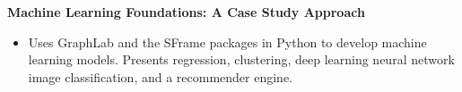 \documentclass[margin,10pt]{res} %
\begin{document}
\begin{resume}
\begin{itemize}
\end{itemize}
\textbf{Machine Learning Foundations: A Case Study Approach}%
 \href{https://www.coursera.org/learn/ml-foundations}{} \\
 \begin{itemize} %
\item Uses GraphLab and the SFrame packages in Python to develop machine learning models. Presents regression, clustering, deep learning neural network image classification, and a recommender engine. 
\end{itemize}






\end{resume}
\vspace*{-2cm}
\end{document}
